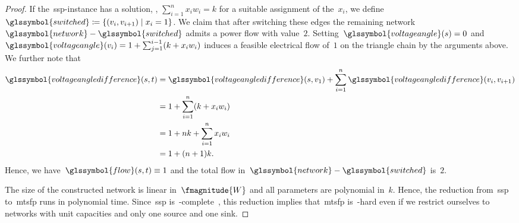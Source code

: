 \begin{proof}
 If the~\gls{ssp}-instance has a solution, \ie, $\sum_{i=1}^n x_i w_i = k$
 for a suitable assignment of the~$x_i$, we define~$\glssymbol{switched} \coloneqq
 \{
 (\vertexb_i,\vertexb_{i+1}) \mid x_i=1\}$. We claim that after switching these
 edges the remaining network~$\glssymbol{network}-\glssymbol{switched}$ admits a
 power flow with value~$2$. Setting~$\glssymbol{voltageangle}(\source)=0$
 and~$\glssymbol{voltageangle}(\vertexb_i) = 1 + \sum_{j=1}^{i-1}(k + x_i w_i)$
 induces a feasible electrical flow of~$1$ on the triangle chain by the
 arguments above. We further note that
 \begin{align*}
 \glssymbol{voltageangledifference}(\source,\sink)
 &= \glssymbol{voltageangledifference}(\source,\vertexb_1) + \sum_{i=1}^n\glssymbol{voltageangledifference}(\vertexb_i,\vertexb_{i+1})\\
 &= 1 + \sum_{i=1}^n(k+x_iw_i)\\
 &= 1 + nk + \sum_{i=1}^n x_i w_i\\
 &= 1 + (n+1)k.
 \end{align*}
 Hence, we have~$\glssymbol{flow}(\source,\sink)\equiv 1$ and the total flow
 in~$\glssymbol{network}-\glssymbol{switched}$ is~$2$.
 
 The size of the constructed network is linear in~$\fmagnitude{W}$ and all
 parameters are polynomial in~$k$. Hence, the reduction from~\gls{ssp}
 to~\gls{mtsfp} runs in polynomial time. Since~\gls{ssp}
 is~\NP-complete~\parencite{Gar79}, this reduction implies that~\gls{mtsfp}
 is~\NP-hard even if we restrict ourselves to networks with unit capacities and
 only one source and one sink.
\end{proof}
% 
%
